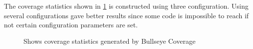 The coverage statistics shown in \ref{FIG:BULLSEYE} is constructed
using three configuration. Using several configurations gave better results since
some code is impossible to reach if not certain configuration parameters are set.

\begin{figure}[!ht]
  \setlength\fboxsep{0pt}
  \setlength\fboxrule{0.5pt}
  \caption{Shows coverage statistics generated by Bullseye Coverage}
  \label{FIG:BULLSEYE}
\end{figure}



